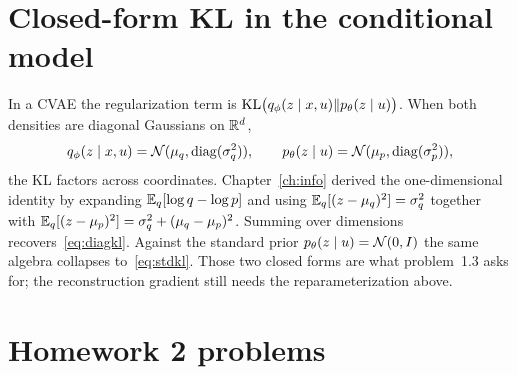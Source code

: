 \section{Closed-form KL in the conditional model}

In a CVAE the regularization term is
$\mathrm{KL}\bigl(q_\phi(z\mid x,u)\Vert p_\theta(z\mid u)\bigr)$.
When both densities are diagonal Gaussians on $\mathbb{R}^d$,
\[
q_\phi(z\mid x,u)=\mathcal{N}(\mu_q,\operatorname{diag}(\sigma_q^2)),\qquad
p_\theta(z\mid u)=\mathcal{N}(\mu_p,\operatorname{diag}(\sigma_p^2)),
\]
the KL factors across coordinates. Chapter~\ref{ch:info} derived the one-dimensional identity by expanding $\mathbb{E}_q[\log q-\log p]$ and using
$\mathbb{E}_q[(z-\mu_q)^2]=\sigma_q^2$ together with
$\mathbb{E}_q[(z-\mu_p)^2]=\sigma_q^2+(\mu_q-\mu_p)^2$. Summing over dimensions recovers~\eqref{eq:diagkl}. Against the standard prior $p_\theta(z\mid u)=\mathcal{N}(0,I)$ the same algebra collapses to~\eqref{eq:stdkl}. Those two closed forms are what problem~1.3 asks for; the reconstruction gradient still needs the reparameterization above.

\section{Homework 2 problems}

